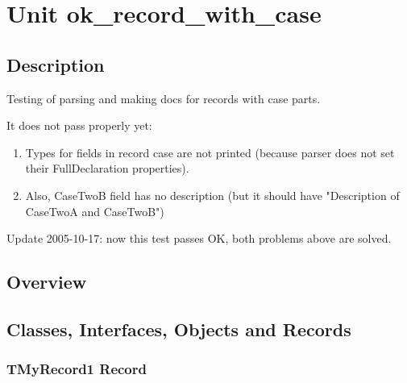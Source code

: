 \documentclass{report}
\newif\ifpdf
\begin{document}
\label{toc}\tableofcontents
\newpage
\newlength{\tmplength}
\chapter{Unit ok{\_}record{\_}with{\_}case}
\label{ok_record_with_case}
\section{Description}
Testing of parsing and making docs for records with case parts.\hfill\vspace*{1ex}



It does not pass properly yet: \begin{enumerate}
\setcounter{enumi}{0} \setcounter{enumii}{0} \setcounter{enumiii}{0} \setcounter{enumiv}{0} 
\item Types for fields in record case are not printed (because parser does not set their FullDeclaration properties).
\setcounter{enumi}{1} \setcounter{enumii}{1} \setcounter{enumiii}{1} \setcounter{enumiv}{1} 
\item Also, CaseTwoB field has no description (but it should have "Description of CaseTwoA and CaseTwoB")
\end{enumerate}

Update 2005{-}10{-}17: now this test passes OK, both problems above are solved.
\section{Overview}
\begin{description}
\item[\texttt{\begin{ttfamily}TMyRecord1\end{ttfamily} Record}]
\item[\texttt{\begin{ttfamily}TMyRecord2\end{ttfamily} Record}]
\end{description}
\section{Classes, Interfaces, Objects and Records}
\ifpdf
\subsection*{\large{\textbf{TMyRecord1 Record}}\normalsize\hspace{1ex}\hrulefill}
\else
\end{document}
